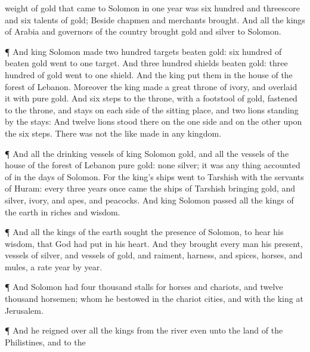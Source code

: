 {weight of
gold that
came to
Solomon in
one
year was
six
hundred and
threescore and
six
talents of
gold;
Beside
{}
chapmen and
merchants
brought. And all the
kings of
Arabia and
governors of the
country
brought
gold and
silver to
Solomon.
\par }{\PP {}¶ And
king
Solomon
made two
hundred
targets
{}
beaten
gold:
six
hundred
{} of
beaten
gold
went to
one
target.
And
three
hundred
shields
{}
beaten
gold:
three
hundred
{} of
gold
went to
one
shield. And the
king
put them in the
house of the
forest of
Lebanon.
Moreover the
king
made a
great
throne of
ivory, and
overlaid it with
pure
gold.
And
{}
six
steps to the
throne, with a
footstool of
gold,
{}
fastened to the
throne, and
stays on each side of the
sitting
place, and
two
lions
standing
by the
stays:
And
twelve
lions
stood there on the one side and on the other upon the
six
steps. There was not the like
made in any
kingdom.
\par }{\PP {}¶ And all the
drinking
vessels of
king
Solomon
{}
gold, and all the
vessels of the
house of the
forest of
Lebanon
{}
pure
gold: none
{}
silver; it was
{}
any thing
accounted of in the
days of
Solomon.
For the
king’s
ships
went to
Tarshish with the
servants of
Huram: every
three
years
once
came the
ships of
Tarshish
bringing
gold, and
silver,
ivory, and
apes, and
peacocks.
And
king
Solomon
passed all the
kings of the
earth in
riches and
wisdom.
\par }{\PP {}¶ And all the
kings of the
earth
sought the
presence of
Solomon, to
hear his
wisdom, that
God had
put in his
heart.
And they
brought every
man his
present,
vessels of
silver, and
vessels of
gold, and
raiment,
harness, and
spices,
horses, and
mules, a
rate
year by
year.
\par }{\PP {}¶ And
Solomon had
four
thousand
stalls for
horses and
chariots, and
twelve
thousand
horsemen; whom he
bestowed in the
chariot
cities, and with the
king at
Jerusalem.
\par }{\PP {}¶ And he
reigned over all the
kings from the
river even unto the
land of the
Philistines, and to the
}
